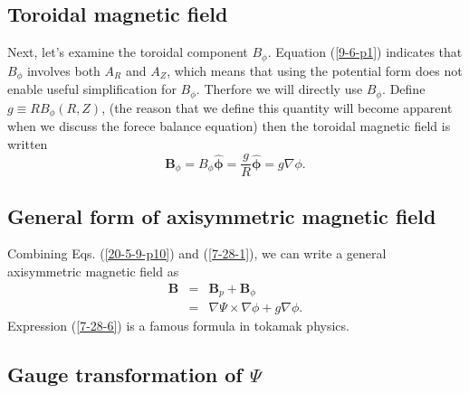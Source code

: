 \documentclass{llncs}
\newcommand{\tmmathbf}[1]{\ensuremath{\boldsymbol{#1}}}
\begin{document}
\subsection{Toroidal magnetic field}

Next, let's examine the toroidal component $B_{\phi}$. Equation (\ref{9-6-p1})
indicates that $B_{\phi}$ involves both $A_R$ and $A_Z$, which means that
using the potential form does not enable useful simplification for $B_{\phi}$.
Therfore we will directly use $B_{\phi}$. Define $g \equiv R B_{\phi} (R, Z)$,
(the reason that we define this quantity will become apparent when we discuss
the forece balance equation) then the toroidal magnetic field is written
\begin{equation}
  \label{7-28-1} \mathbf{B}_{\phi} = B_{\phi} \hat{\tmmathbf{\phi}} =
  \frac{g}{R} \hat{\tmmathbf{\phi}} = g \nabla \phi .
\end{equation}

\subsection{General form of axisymmetric magnetic field}

Combining Eqs. (\ref{20-5-9-p10}) and (\ref{7-28-1}), we can write a general
axisymmetric magnetic field as
\begin{eqnarray}
  \mathbf{B} & = & \mathbf{B}_p +\mathbf{B}_{\phi} \nonumber\\
  & = & \nabla \Psi \times \nabla \phi + g \nabla \phi .  \label{7-28-6}
\end{eqnarray}
Expression (\ref{7-28-6}) is a famous formula in tokamak physics.

\subsection{Gauge transformation of $\Psi$}
\end{document}
